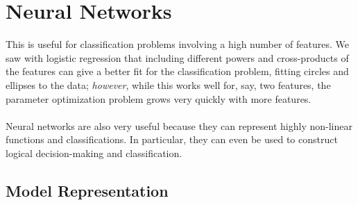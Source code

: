 \documentclass[12pt]{article}
\begin{document}
\newpage
\section{Neural Networks}

This is useful for classification problems involving a high
number of features.  We saw with logistic regression that including
different powers and cross-products of the features can give a
better fit for the classification problem, fitting circles and ellipses
to the data; \emph{however},
while this works well for, say, two features, the parameter
optimization problem grows very quickly with more features.
\\
\\
Neural networks are also very useful because they can represent
highly non-linear functions and classifications.  In particular,
they can even be used to construct logical decision-making and
classification.

\subsection{Model Representation}
\end{document}
